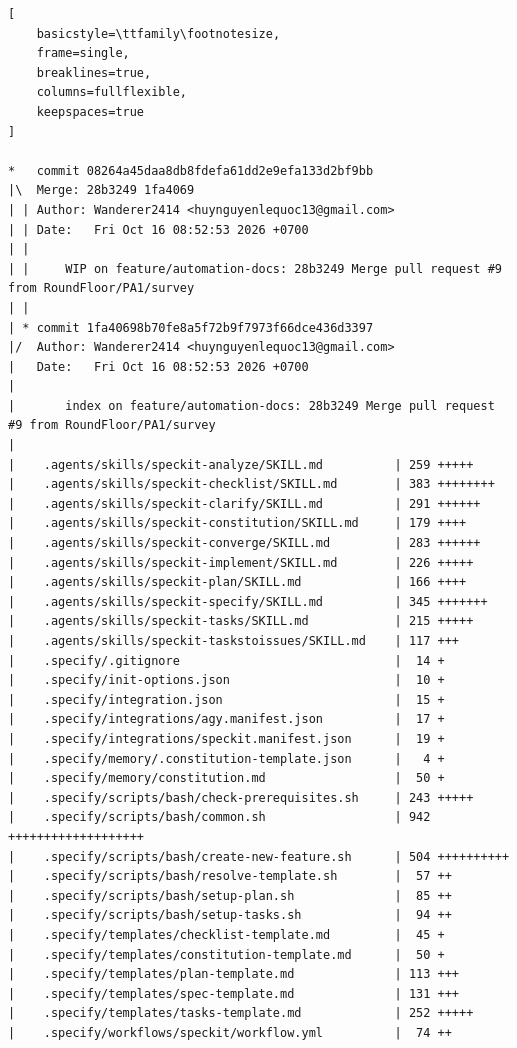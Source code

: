 \begin{lstlisting}[
    basicstyle=\ttfamily\footnotesize,
    frame=single,
    breaklines=true,
    columns=fullflexible,
    keepspaces=true
]

*   commit 08264a45daa8db8fdefa61dd2e9efa133d2bf9bb
|\  Merge: 28b3249 1fa4069
| | Author: Wanderer2414 <huynguyenlequoc13@gmail.com>
| | Date:   Fri Oct 16 08:52:53 2026 +0700
| | 
| |     WIP on feature/automation-docs: 28b3249 Merge pull request #9 from RoundFloor/PA1/survey
| | 
| * commit 1fa40698b70fe8a5f72b9f7973f66dce436d3397
|/  Author: Wanderer2414 <huynguyenlequoc13@gmail.com>
|   Date:   Fri Oct 16 08:52:53 2026 +0700
|   
|       index on feature/automation-docs: 28b3249 Merge pull request #9 from RoundFloor/PA1/survey
|   
|    .agents/skills/speckit-analyze/SKILL.md          | 259 +++++
|    .agents/skills/speckit-checklist/SKILL.md        | 383 ++++++++
|    .agents/skills/speckit-clarify/SKILL.md          | 291 ++++++
|    .agents/skills/speckit-constitution/SKILL.md     | 179 ++++
|    .agents/skills/speckit-converge/SKILL.md         | 283 ++++++
|    .agents/skills/speckit-implement/SKILL.md        | 226 +++++
|    .agents/skills/speckit-plan/SKILL.md             | 166 ++++
|    .agents/skills/speckit-specify/SKILL.md          | 345 +++++++
|    .agents/skills/speckit-tasks/SKILL.md            | 215 +++++
|    .agents/skills/speckit-taskstoissues/SKILL.md    | 117 +++
|    .specify/.gitignore                              |  14 +
|    .specify/init-options.json                       |  10 +
|    .specify/integration.json                        |  15 +
|    .specify/integrations/agy.manifest.json          |  17 +
|    .specify/integrations/speckit.manifest.json      |  19 +
|    .specify/memory/.constitution-template.json      |   4 +
|    .specify/memory/constitution.md                  |  50 +
|    .specify/scripts/bash/check-prerequisites.sh     | 243 +++++
|    .specify/scripts/bash/common.sh                  | 942 +++++++++++++++++++
|    .specify/scripts/bash/create-new-feature.sh      | 504 ++++++++++
|    .specify/scripts/bash/resolve-template.sh        |  57 ++
|    .specify/scripts/bash/setup-plan.sh              |  85 ++
|    .specify/scripts/bash/setup-tasks.sh             |  94 ++
|    .specify/templates/checklist-template.md         |  45 +
|    .specify/templates/constitution-template.md      |  50 +
|    .specify/templates/plan-template.md              | 113 +++
|    .specify/templates/spec-template.md              | 131 +++
|    .specify/templates/tasks-template.md             | 252 +++++
|    .specify/workflows/speckit/workflow.yml          |  74 ++

\end{lstlisting}
